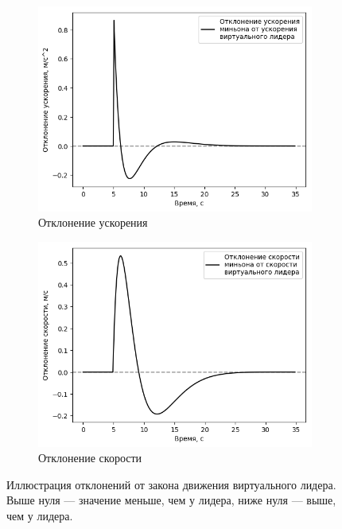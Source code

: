 \documentclass[a4paper, 14pt]{extarticle}
\begin{document}
\begin{figure}[!htbp]
	\centering
	\begin{subfigure}{.5\textwidth}
	\centering
	\includegraphics[width=1\linewidth]{minion/heviside_axerr}
	\caption{Отклонение ускорения}
	\label{fig:hevisideaxerr}
	\end{subfigure}%
	\begin{subfigure}{.5\textwidth}
	\centering
	\includegraphics[width=1\linewidth]{minion/heviside_velerr}
	\caption{Отклонение скорости}
	\label{fig:hevisidevelerr}
	\end{subfigure}
	\caption{Иллюстрация отклонений от закона движения виртуального лидера. Выше нуля — значение меньше, чем у лидера, ниже нуля — выше, чем у лидера.}
	\label{fig:errors-minion-heviside}
\end{figure}
\end{document}
